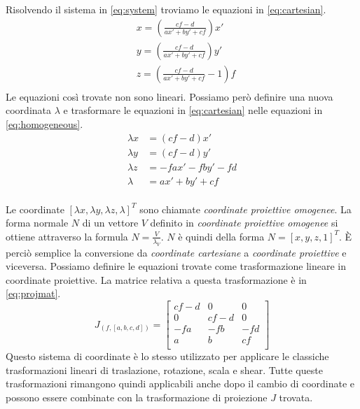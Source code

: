Risolvendo il sistema in \ref{eq:system} troviamo le equazioni in \ref{eq:cartesian}.
\begin{equation}
    \label{eq:cartesian}
    \begin{aligned}
         & x = \left( \frac{cf - d}{ax' + by' + cf} \right) x'    \\
         & y = \left( \frac{cf - d}{ax' + by' + cf} \right) y'    \\
         & z = \left( \frac{cf - d}{ax' + by' + cf} - 1 \right) f \\
    \end{aligned}
\end{equation}
Le equazioni così trovate non sono lineari.
Possiamo però definire una nuova coordinata $\lambda$ e trasformare le equazioni in \ref{eq:cartesian} nelle equazioni in \ref{eq:homogeneous}.
\begin{equation}
    \label{eq:homogeneous}
    \begin{aligned}
        \lambda x & = (cf - d) x'       \\
        \lambda y & = (cf - d) y'       \\
        \lambda z & = -fax' - fby' - fd \\
        \lambda   & = ax' + by' + cf    \\
    \end{aligned}
\end{equation}

Le coordinate $[\lambda x, \lambda y, \lambda z, \lambda]^T$ sono chiamate \emph{coordinate proiettive omogenee}.
La forma normale $N$ di un vettore $V$ definito in \emph{coordinate proiettive omogenee} si ottiene attraverso la formula $N = \displaystyle\frac{V}{\lambda_V}$.
$N$ è quindi della forma $N = [x, y, z, 1]^T$.
È perciò semplice la conversione da \emph{coordinate cartesiane} a \emph{coordinate proiettive} e viceversa.
Possiamo definire le equazioni trovate come trasformazione lineare in coordinate proiettive.
La matrice relativa a questa trasformazione è in \ref{eq:projmat}.
\begin{equation}
    \label{eq:projmat}
    J_{(f, [a, b, c, d])} =
    \begin{bmatrix}
        cf - d & 0      & 0   \\
        0      & cf - d & 0   \\
        -fa    & -fb    & -fd \\
        a      & b      & cf  \\
    \end{bmatrix}
\end{equation}
Questo sistema di coordinate è lo stesso utilizzato per applicare le classiche trasformazioni lineari di traslazione, rotazione, scala e shear.
Tutte queste trasformazioni rimangono quindi applicabili anche dopo il cambio di coordinate e possono essere combinate con la trasformazione di proiezione $J$ trovata.

